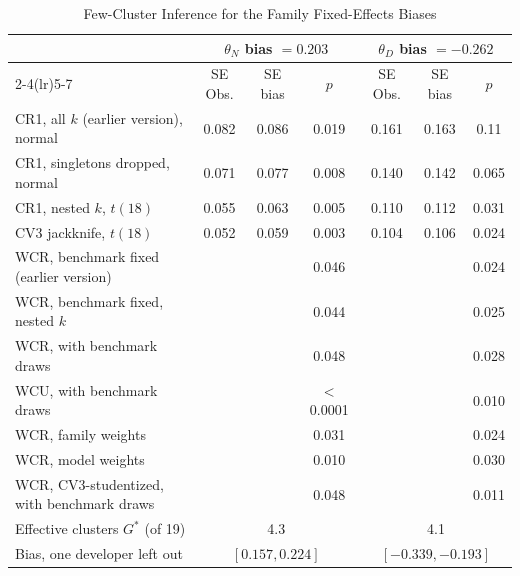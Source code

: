 \begin{table}[tp]
\centering
\caption{Few-Cluster Inference for the Family Fixed-Effects Biases}
\label{tab:inference}
\footnotesize
\setlength{\tabcolsep}{3pt}
\begin{tabular}{@{}l ccc ccc@{}}
\toprule
 & \multicolumn{3}{c}{$\theta_N$ bias $=0.203$} & \multicolumn{3}{c}{$\theta_D$ bias $=-0.262$} \\
\cmidrule(lr){2-4}\cmidrule(lr){5-7}
 & SE Obs. & SE bias & $p$ & SE Obs. & SE bias & $p$ \\
\midrule
CR1, all $k$ (earlier version), normal & 0.082 & 0.086 & 0.019 & 0.161 & 0.163 & 0.11 \\
CR1, singletons dropped, normal & 0.071 & 0.077 & 0.008 & 0.140 & 0.142 & 0.065 \\
CR1, nested $k$, $t(18)$ & 0.055 & 0.063 & 0.005 & 0.110 & 0.112 & 0.031 \\
CV3 jackknife, $t(18)$ & 0.052 & 0.059 & 0.003 & 0.104 & 0.106 & 0.024 \\
\addlinespace[2pt]
WCR, benchmark fixed (earlier version) &  &  & 0.046 &  &  & 0.024 \\
WCR, benchmark fixed, nested $k$ &  &  & 0.044 &  &  & 0.025 \\
WCR, with benchmark draws &  &  & 0.048 &  &  & 0.028 \\
WCU, with benchmark draws &  &  & $<$0.0001 &  &  & 0.010 \\
WCR, family weights &  &  & 0.031 &  &  & 0.024 \\
WCR, model weights &  &  & 0.010 &  &  & 0.030 \\
WCR, CV3-studentized, with benchmark draws &  &  & 0.048 &  &  & 0.011 \\
\addlinespace[2pt]
Effective clusters $G^*$ (of 19) & \multicolumn{3}{c}{4.3} & \multicolumn{3}{c}{4.1} \\
Bias, one developer left out & \multicolumn{3}{c}{$[0.157,0.224]$} & \multicolumn{3}{c}{$[-0.339,-0.193]$} \\
\bottomrule
\end{tabular}


\end{table}
